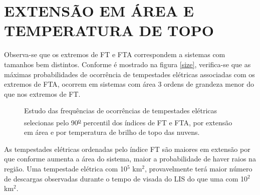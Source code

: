 


\section{EXTENSÃO EM ÁREA E TEMPERATURA DE TOPO}

Observa-se que os extremos de FT e FTA correspondem a sistemas com tamanhos bem distintos. Conforme é mostrado na figura \ref{size}, verifica-se que as máximas probabilidades de ocorrência de tempestades elétricas associadas com os extremos de FTA, ocorrem em sistemas com área 3 ordens de grandeza menor do que nos extremos de FT.



\begin{figure}[!hb]
  \label{t_tb}
  \caption{Estudo das frequências de ocorrências de tempestades elétricas selecionas pelo 90\textsuperscript{\underline{o}} percentil dos índices de FT e FTA, por extensão em área e por temperatura de brilho de topo das nuvens.}
\end{figure}


As tempestades elétricas ordenadas pelo índice FT são maiores em extensão por que conforme aumenta a área do sistema, maior a probabilidade de haver raios na região. Uma tempestade elétrica com 10$^5$ km$^2$, provavelmente terá maior número de descargas observadas durante o tempo de visada do LIS do que uma com 10$^2$ km$^2$. 


